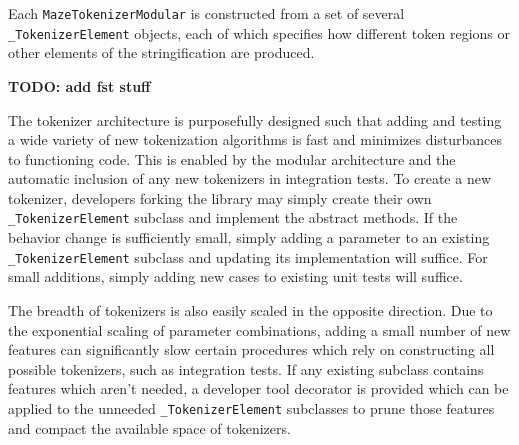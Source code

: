 \documentclass[10pt,a4paper,onecolumn]{article}
\let\origfigure\figure
\let\endorigfigure\endfigure
\renewenvironment{figure}[1][2] {
    \expandafter\origfigure\expandafter[H]
} {
    \endorigfigure
}
\begin{document}
\begin{figure} 
  \centering
  \begin{minipage}{5in}
    \footnotesize
    
  \end{minipage}
  \caption{
    Example text output format with token regions highlighted.
    \colorbox[RGB]{ 217,210,233 }{Adjacency list}: text representation of the lattice graph,
    \colorbox[RGB]{ 217,234,211 }{Origin}: starting coordinate,
    \colorbox[RGB]{ 234,209,220 }{Target}: ending coordinate,
    \colorbox[RGB]{ 207,226,243 }{Path}: maze solution sequence
  }
  \label{fig:token-regions}
\end{figure}

Each \texttt{MazeTokenizerModular} is constructed from a set of several
\texttt{\_TokenizerElement} objects, each of which specifies how
different token regions or other elements of the stringification are
produced.

\begin{figure}
    \centering
    
    \caption{Nested internal structure of \texttt{\_TokenizerElement} objects inside a typical \texttt{MazeTokenizerModular} object.}
\end{figure}

\textbf{TODO: add fst stuff}

The tokenizer architecture is purposefully designed such that adding and
testing a wide variety of new tokenization algorithms is fast and
minimizes disturbances to functioning code. This is enabled by the
modular architecture and the automatic inclusion of any new tokenizers
in integration tests. To create a new tokenizer, developers forking the
library may simply create their own \texttt{\_TokenizerElement} subclass
and implement the abstract methods. If the behavior change is
sufficiently small, simply adding a parameter to an existing
\texttt{\_TokenizerElement} subclass and updating its implementation
will suffice. For small additions, simply adding new cases to existing
unit tests will suffice.

The breadth of tokenizers is also easily scaled in the opposite
direction. Due to the exponential scaling of parameter combinations,
adding a small number of new features can significantly slow certain
procedures which rely on constructing all possible tokenizers, such as
integration tests. If any existing subclass contains features which
aren't needed, a developer tool decorator is provided which can be
applied to the unneeded \texttt{\_TokenizerElement} subclasses to prune
those features and compact the available space of tokenizers.
\end{document}
